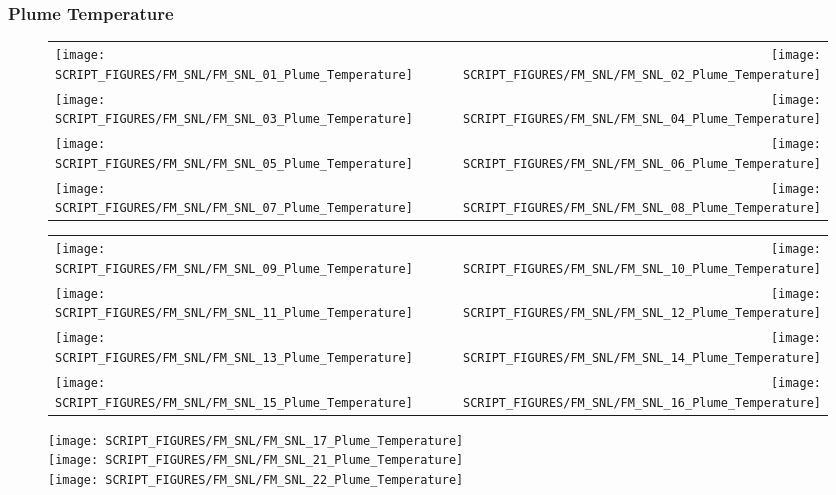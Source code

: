 \clearpage

\subsubsection{Plume Temperature}

\begin{figure}[!ht]
\begin{tabular*}{\textwidth}{l@{\extracolsep{\fill}}r}
\texttt{[image: SCRIPT\_FIGURES/FM\_SNL/FM\_SNL\_01\_Plume\_Temperature]} &
\texttt{[image: SCRIPT\_FIGURES/FM\_SNL/FM\_SNL\_02\_Plume\_Temperature]} \\
\texttt{[image: SCRIPT\_FIGURES/FM\_SNL/FM\_SNL\_03\_Plume\_Temperature]} &
\texttt{[image: SCRIPT\_FIGURES/FM\_SNL/FM\_SNL\_04\_Plume\_Temperature]} \\
\texttt{[image: SCRIPT\_FIGURES/FM\_SNL/FM\_SNL\_05\_Plume\_Temperature]} &
\texttt{[image: SCRIPT\_FIGURES/FM\_SNL/FM\_SNL\_06\_Plume\_Temperature]} \\
\texttt{[image: SCRIPT\_FIGURES/FM\_SNL/FM\_SNL\_07\_Plume\_Temperature]} &
\texttt{[image: SCRIPT\_FIGURES/FM\_SNL/FM\_SNL\_08\_Plume\_Temperature]}
\end{tabular*}
\end{figure}

\begin{figure}[!ht]
\begin{tabular*}{\textwidth}{l@{\extracolsep{\fill}}r}
\texttt{[image: SCRIPT\_FIGURES/FM\_SNL/FM\_SNL\_09\_Plume\_Temperature]} &
\texttt{[image: SCRIPT\_FIGURES/FM\_SNL/FM\_SNL\_10\_Plume\_Temperature]} \\
\texttt{[image: SCRIPT\_FIGURES/FM\_SNL/FM\_SNL\_11\_Plume\_Temperature]} &
\texttt{[image: SCRIPT\_FIGURES/FM\_SNL/FM\_SNL\_12\_Plume\_Temperature]} \\
\texttt{[image: SCRIPT\_FIGURES/FM\_SNL/FM\_SNL\_13\_Plume\_Temperature]} &
\texttt{[image: SCRIPT\_FIGURES/FM\_SNL/FM\_SNL\_14\_Plume\_Temperature]} \\
\texttt{[image: SCRIPT\_FIGURES/FM\_SNL/FM\_SNL\_15\_Plume\_Temperature]} &
\texttt{[image: SCRIPT\_FIGURES/FM\_SNL/FM\_SNL\_16\_Plume\_Temperature]}
\end{tabular*}
\end{figure}

\begin{figure}[!ht]
\begin{center}
\texttt{[image: SCRIPT\_FIGURES/FM\_SNL/FM\_SNL\_17\_Plume\_Temperature]} \\
\texttt{[image: SCRIPT\_FIGURES/FM\_SNL/FM\_SNL\_21\_Plume\_Temperature]} \\
\texttt{[image: SCRIPT\_FIGURES/FM\_SNL/FM\_SNL\_22\_Plume\_Temperature]}
\end{center}
\end{figure}

